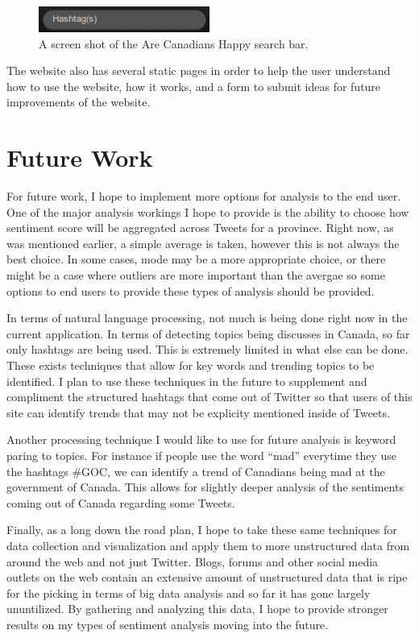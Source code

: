 \documentclass[conference]{IEEEtran}
\begin{document}
\begin{figure}[tb!]
\centering
\includegraphics[width=0.5\textwidth]{images/search.png}
\caption{A screen shot of the Are Canadians Happy search bar.\label{fig:search}}
\end{figure}

The website also has several static pages in order to help the user understand how to use the website, how
it works, and a form to submit ideas for future improvements of the website.

\section{Future Work}
\label{sec:fw}

For future work, I hope to implement more options for analysis to the end user. One of the major
analysis workings I hope to provide is the ability to choose how sentiment score will be aggregated
across Tweets for a province. Right now, as was mentioned earlier, a simple average is taken, however
this is not always the best choice. In some cases, mode may be a more appropriate choice, or there
might be a case where outliers are more important than the avergae so some options to end users to
provide these types of analysis should be provided.

In terms of natural language processing, not much is being done right now in the current application.
In terms of detecting topics being discusses in Canada, so far only hashtags are being used. This is extremely
limited in what else can be done. These exists techniques that allow for key words and trending topics
to be identified. I plan to use these techniques in the future to supplement and compliment the structured
hashtags that come out of Twitter so that users of this site can identify trends that may not be explicity
mentioned inside of Tweets.

Another processing technique I would like to use for future analysis is keyword paring to topics. For instance
if people use the word ``mad'' everytime they use the hashtags \#GOC, we can identify a trend of Canadians
being mad at the government of Canada. This allows for slightly deeper analysis of the sentiments coming
out of Canada regarding some Tweets.

Finally, as a long down the road plan, I hope to take these same techniques for data collection and visualization
and apply them to more unstructured data from around the web and not just Twitter. Blogs, forums and other social 
media outlets on the web contain an extensive amount of unstructured data that is ripe for the picking in terms
of big data analysis and so far it has gone largely ununtilized. By gathering and analyzing this data, I hope
to provide stronger results on my types of sentiment analysis moving into the future.
\end{document}

